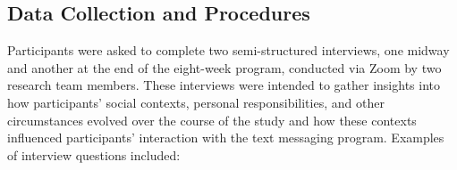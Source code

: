 


\subsection{Data Collection and Procedures}

Participants were asked to complete two semi-structured interviews, one midway and another at the end of the eight-week program, conducted via Zoom by two research team members. These interviews were intended to gather insights into how participants' social contexts, personal responsibilities, and other circumstances evolved over the course of the study and how these contexts influenced participants' interaction with the text messaging program. Examples of interview questions included:


